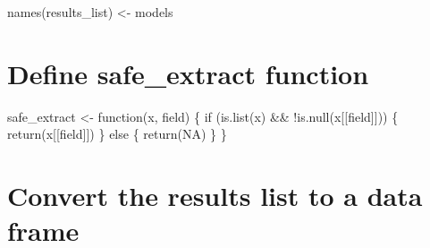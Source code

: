 \documentclass[
]{article}
\begin{document}
names(results\_list) \textless- models

\hypertarget{define-safe_extract-function}{%
\section{Define safe\_extract function}\label{define-safe_extract-function}}

safe\_extract \textless- function(x, field) \{
if (is.list(x) \&\& !is.null(x{[}{[}field{]}{]})) \{
return(x{[}{[}field{]}{]})
\} else \{
return(NA)
\}
\}

\hypertarget{convert-the-results-list-to-a-data-frame}{%
\section{Convert the results list to a data frame}\label{convert-the-results-list-to-a-data-frame}}
\end{document}
